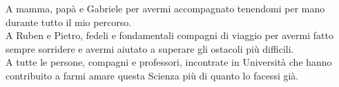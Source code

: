 \cleardoublepage
\begingroup
\let\clearpage\endgroup
\null{}

\begin{flushright}
\begin{minipage}{5.3in}
\begin{flushright}
\begin{em}
A mamma, papà e Gabriele per avermi accompagnato tenendomi per mano durante tutto il mio percorso.
\\[12pt]
A Ruben e Pietro, fedeli e fondamentali compagni di viaggio per avermi fatto sempre sorridere e avermi aiutato a superare gli ostacoli più difficili.
\\[12pt]
A tutte le persone, compagni e professori, incontrate in Università che hanno contribuito a farmi amare questa Scienza più di quanto lo facessi già.

\end{em}
\end{flushright}
\end{minipage}
\end{flushright}
 \null
